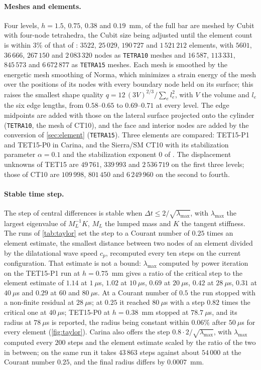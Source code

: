 \documentclass{article}
\newcommand{\code}[1]{\texttt{#1}}
\theoremstyle{definition}
\theoremstyle{plain}
\begin{document}
\paragraph{Meshes and elements.} Four levels, $h = 1.5$, $0.75$, $0.38$ and
$0.19$~mm, of the full bar are meshed by Cubit with four-node tetrahedra,
the Cubit size being adjusted until the element count is within $3\%$ of
that of \textcite[Figure~14]{Foulk.etal:2021}: $3522$, $25\,029$,
$190\,727$ and $1\,521\,212$ elements, with $5601$, $36\,666$, $267\,150$
and $2\,083\,320$ nodes as \code{TETRA10} meshes and $16\,587$, $113\,331$,
$845\,573$ and $6\,672\,877$ as \code{TETRA15} meshes. Each mesh is smoothed by the
energetic mesh smoothing of Norma, which minimizes a strain energy of the
mesh over the positions of its nodes with every boundary node held on its
surface; this raises the smallest shape quality
$q = 12\,(3V)^{2/3} / \sum_{e} l_e^2$, with $V$ the volume and $l_e$ the
six edge lengths, from $0.58$--$0.65$ to $0.69$--$0.71$ at every level. The
edge midpoints are added with those on the lateral surface projected onto
the cylinder (\code{TETRA10}, the mesh of CT10), and
the face and interior nodes are added by the conversion of
\cref{sec:element} (\code{TETRA15}). Three elements are compared:
TET15-P1 and TET15-P0 in Carina, and the Sierra/SM CT10
with its stabilization parameter $\alpha = 0.1$ and the stabilization
exponent $0$ of \textcite{Foulk.etal:2021}. The displacement unknowns of
TET15 are $49\,761$, $339\,993$ and $2\,536\,719$ on the first three
levels; those of CT10 are $109\,998$, $801\,450$ and
$6\,249\,960$ on the second to fourth.

\paragraph{Stable time step.} The step of central differences is stable
when $\Delta t \le 2/\sqrt{\lambda_{\max}}$, with $\lambda_{\max}$ the
largest eigenvalue of $M_L^{-1} K$, $M_L$ the lumped mass and $K$ the
tangent stiffness. The runs of \cref{tab:taylor} set the step to a
Courant number of $0.25$ times an element estimate, the smallest distance
between two nodes of an element divided by the dilatational wave speed
$c_p$, recomputed every ten steps on the current configuration. That
estimate is not a bound: $\lambda_{\max}$ computed by power iteration on
the TET15-P1 run at $h = 0.75$~mm gives a ratio of the critical step to the
element estimate of $1.14$ at $1~\mu$s, $1.02$ at $10~\mu$s, $0.69$ at
$20~\mu$s, $0.42$ at $28~\mu$s, $0.31$ at $40~\mu$s and $0.29$ at $60$ and
$80~\mu$s. At a Courant number of $0.5$ the run stopped with a non-finite
residual at $28~\mu$s; at $0.25$ it reached $80~\mu$s with a step $0.82$
times the critical one at $40~\mu$s; TET15-P0 at $h = 0.38$~mm stopped at
$78.7~\mu$s, and its radius at $78~\mu$s is reported, the radius being
constant within $0.06\%$ after $50~\mu$s for every element
(\cref{fig:taylor}). Carina
also offers the step $0.8 \cdot 2/\sqrt{\lambda_{\max}}$, with
$\lambda_{\max}$ computed every $200$ steps and the element estimate scaled
by the ratio of the two in between; on the same run it takes $43\,863$
steps against about $54\,000$ at the Courant number $0.25$, and the final
radius differs by $0.0007$~mm.
\end{document}
